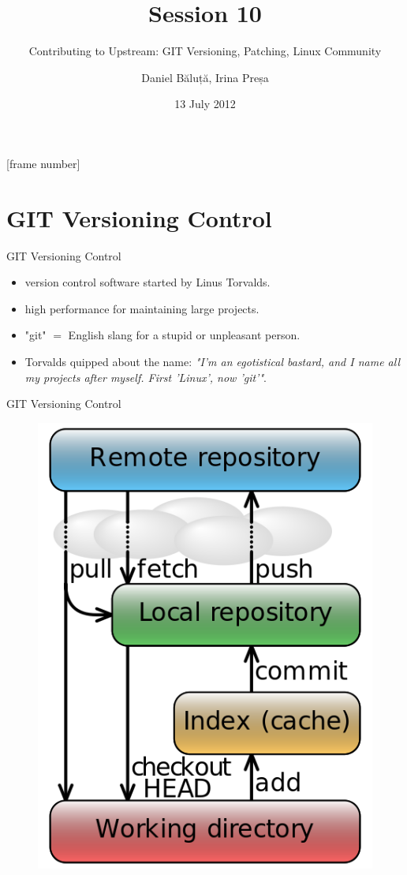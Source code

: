 \documentclass{workshop}
\title[Sesssion 10]{Session 10}
\subtitle{Contributing to Upstream: GIT Versioning, Patching, Linux Community}
\author{Daniel Băluță, Irina Preșa}
\date{13 July 2012}
\begin{document}
[frame number]

\frame{\titlepage}

\section{GIT Versioning Control}

\begin{frame}{GIT Versioning Control}
\begin{itemize}
\item version control software started by Linus Torvalds.
\item high performance for maintaining large projects.
\item<2> "git" $=$ English slang for a stupid or unpleasant person.
\item<2> Torvalds quipped about the name: \emph{"I'm an egotistical bastard, and I
name all my projects after myself. First 'Linux', now 'git'"}.
\end{itemize}
\end{frame}

\begin{frame}{GIT Versioning Control}
\begin{figure}
  \includegraphics[scale=0.3]{img/flow.png}
\end{figure}
\end{frame}
\end{document}
